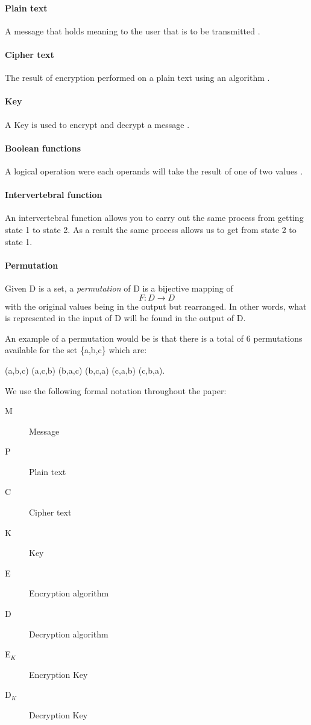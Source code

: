 \documentclass[11pt,a4paper, notitlepage]{report}
\begin{document}
\paragraph{Plain text}
A message that holds meaning to the user that is to be transmitted \cite{DBLP:books/sp/Buchmann02}.

\paragraph{Cipher text}
The result of encryption performed on a plain text using an algorithm \cite{Berti2003CISSP}.

\paragraph{Key}
A Key is used to encrypt and decrypt a message \cite{Berti2003CISSP}.

\paragraph{Boolean functions}
A logical operation were each operands will take the result of one of two values \cite{Gregory2013Cryptanalysis}.

\paragraph{Intervertebral function}
An intervertebral function allows you to carry out the
same process from getting state 1 to state 2. As a result the same process
allows us to get from state 2 to state 1.

\paragraph{Permutation}
Given D is a set, a \emph{permutation} of D is a bijective mapping of
\begin{displaymath}
F: D \rightarrow D
\end{displaymath}
with the original values being in the output but rearranged. In other words, what is represented in the input of D will be found in the output of D.

An example of a permutation would be is that there is a total of 6 permutations available for the set \{a,b,c\} which are:
\begin{center}
(a,b,c) (a,c,b) (b,a,c) (b,c,a) (c,a,b) (c,b,a).
\end{center}


We use the following formal notation throughout the paper:
\begin{description}
\item[M] Message
\item[P] Plain text
\item[C] Cipher text
\item[K] Key
\item[E] Encryption algorithm
\item[D] Decryption algorithm
\item[E$_{K}$] Encryption Key
\item[D$_{K}$] Decryption Key
\end{description}
\end{document}
